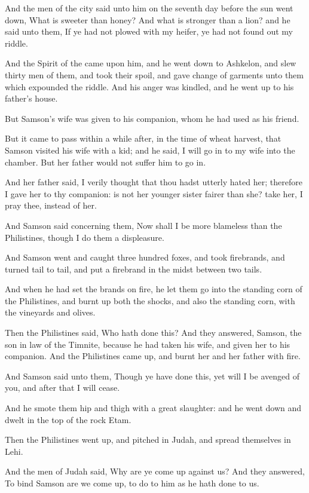 \Verse And the men of the city said unto him on the seventh day before the sun went down, What is sweeter than honey? And what is stronger than a lion?  and he said unto them, If ye had not plowed with my heifer, ye had not found out my riddle.

\Verse And the Spirit of the \LORD came upon him, and he went down to Ashkelon, and slew thirty men of them, and took their spoil, and gave change of garments unto them which expounded the riddle. And his anger was kindled, and he went up to his father's house.

\Verse But Samson's wife was given to his companion, whom he had used as his friend.


\Chapter
\Verse But it came to pass within a while after, in the time of wheat harvest, that Samson visited his wife with a kid; and he said, I will go in to my wife into the chamber. But her father would not suffer him to go in.

\Verse And her father said, I verily thought that thou hadst utterly hated her; therefore I gave her to thy companion: is not her younger sister fairer than she? take her, I pray thee, instead of her.

\Verse And Samson said concerning them, Now shall I be more blameless than the Philistines, though I do them a displeasure.

\Verse And Samson went and caught three hundred foxes, and took firebrands, and turned tail to tail, and put a firebrand in the midst between two tails.

\Verse And when he had set the brands on fire, he let them go into the standing corn of the Philistines, and burnt up both the shocks, and also the standing corn, with the vineyards and olives.

\Verse Then the Philistines said, Who hath done this? And they answered, Samson, the son in law of the Timnite, because he had taken his wife, and given her to his companion. And the Philistines came up, and burnt her and her father with fire.

\Verse And Samson said unto them, Though ye have done this, yet will I be avenged of you, and after that I will cease.

\Verse And he smote them hip and thigh with a great slaughter: and he went down and dwelt in the top of the rock Etam.

\Verse Then the Philistines went up, and pitched in Judah, and spread themselves in Lehi.

\Verse And the men of Judah said, Why are ye come up against us? And they answered, To bind Samson are we come up, to do to him as he hath done to us.

